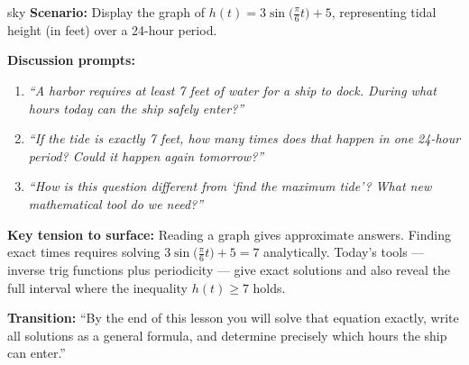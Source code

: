 \documentclass[10pt]{article}
\begin{document}
\vspace{0.08in}

\begin{skillbox}{sky}
\textbf{Scenario:} Display the graph of $h(t) = 3\sin\!\bigl(\tfrac{\pi}{6}t\bigr) + 5$,
representing tidal height (in feet) over a 24-hour period.

\textbf{Discussion prompts:}
\begin{enumerate}[leftmargin=1.4em, itemsep=3pt]
  \item \textit{``A harbor requires at least 7 feet of water for a ship to
    dock. During what hours today can the ship safely enter?''}
  \item \textit{``If the tide is exactly 7 feet, how many times does that
    happen in one 24-hour period? Could it happen again tomorrow?''}
  \item \textit{``How is this question different from `find the maximum tide'?
    What new mathematical tool do we need?''}
\end{enumerate}

\textbf{Key tension to surface:} Reading a graph gives approximate answers.
Finding exact times requires solving $3\sin\!\bigl(\tfrac{\pi}{6}t\bigr) + 5 = 7$
analytically. Today's tools --- inverse trig functions plus periodicity ---
give exact solutions and also reveal the full interval where the inequality
$h(t) \ge 7$ holds.

\textbf{Transition:} ``By the end of this lesson you will solve that equation
exactly, write all solutions as a general formula, and determine precisely
which hours the ship can enter.''
\end{skillbox}

\vspace{0.08in}
\end{document}
